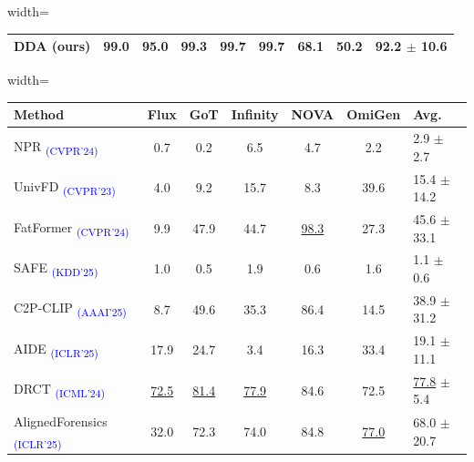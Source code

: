 \documentclass{article}
\begin{document}
\begin{table}[tb!]
\begin{minipage}[t]{0.51\textwidth}
\begin{adjustbox}{width=\linewidth}
\begin{tabular}{lc|cccccc|l}
    \rowcolor{myblue}
    \rowcolor{myblue}
\textbf{DDA (ours)} & 99.0 & \textbf{95.0} & \textbf{99.3} & \textbf{99.7} & \textbf{99.7} & \textbf{68.1} & \textbf{50.2} & \textbf{92.2} $\pm$ 10.6 \\
\bottomrule
    \end{tabular}
    \end{adjustbox}
    \vspace{0pt}
  \end{minipage}
  \hfill
  \begin{minipage}[t]{0.43\textwidth}
    \centering
    \label{tab:compare-eval-gen}
      \begin{adjustbox}{width=\linewidth}
      \begin{tabular}{lcccccl}
      \toprule
      Method & Flux & GoT & Infinity & NOVA & OmiGen & Avg. \\
      \midrule
NPR \textsubscript{\textcolor{blue}{(CVPR'24)}} \cite{cozzolino2024zero} & 0.7 & 0.2 & 6.5 & 4.7 & 2.2 & 2.9 $\pm$ 2.7 \\
UnivFD \textsubscript{\textcolor{blue}{(CVPR'23)}} \cite{ojha2023towards} & 4.0 & 9.2 & 15.7 & 8.3 & 39.6 & 15.4 $\pm$ 14.2 \\
FatFormer \textsubscript{\textcolor{blue}{(CVPR'24)}} \cite{liu2024forgery} & 9.9 & 47.9 & 44.7 & \underline{98.3} & 27.3 & 45.6 $\pm$ 33.1 \\
SAFE \textsubscript{\textcolor{blue}{(KDD'25)}} \cite{li2024improving} & 1.0 & 0.5 & 1.9 & 0.6 & 1.6 & 1.1 $\pm$ 0.6 \\
C2P-CLIP \textsubscript{\textcolor{blue}{(AAAI'25)}} \cite{tan2024c2p} & 8.7 & 49.6 & 35.3 & 86.4 & 14.5 & 38.9 $\pm$ 31.2 \\
AIDE \textsubscript{\textcolor{blue}{(ICLR'25)}} \cite{yan2024sanity} & 17.9 & 24.7 & 3.4 & 16.3 & 33.4 & 19.1 $\pm$ 11.1 \\
DRCT \textsubscript{\textcolor{blue}{(ICML'24)}} \cite{chen2024drct} & \underline{72.5} & \underline{81.4} & \underline{77.9} & 84.6 & 72.5 & \underline{77.8} $\pm$ 5.4 \\
AlignedForensics \textsubscript{\textcolor{blue}{(ICLR'25)}} \cite{rajan2025aligned} & 32.0 & 72.3 & 74.0 & 84.8 & \underline{77.0} & 68.0 $\pm$ 20.7 \\

\end{tabular}
\end{adjustbox}
\end{minipage}
\end{table}
\end{document}
